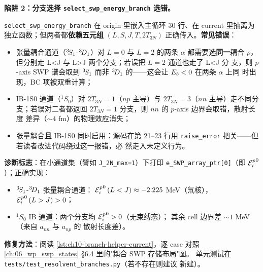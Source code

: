 \begin{pitfallbox}[label=box:ch10-pitfall-branch]
\textbf{陷阱 2：分支选择 \texttt{select\_swp\_energy\_branch} 选错。}

\texttt{select\_swp\_energy\_branch} 在 origin 里嵌入主循环 30 行、在 current
里抽离为独立函数；但两者都\textbf{依赖五元组} \((L, S, J, T, 2T_{3N})\)
正确传入。\textbf{常见错误}：

\begin{itemize}
  \item 张量耦合通道（\({}^{3}\!S_{1}\)-\({}^{3}\!D_{1}\)）对 \(L=0\)
        与 \(L=2\) 的两条 \(\alpha\) 都需要选\textbf{同一}耦合 \(\rho\)，
        但分别走 L<J 与 L>J 两个分支；若误把 \(L=2\) 通道也走了 L<J 分
        支，则 \(p\)-axis SWP 谱会取到 \({}^{3}\!S_{1}\) 而非
        \({}^{3}\!D_{1}\) 的——这会让 \(E_b < 0\) 在两条 \(\alpha\) 上同
        时出现，BC 项被双重计算；
  \item IB-1S0 通道（\({}^1S_0\)）对 \(2T_{3N}=1\)（\(np\) 主导）与
        \(2T_{3N}=3\)（\(nn\) 主导）走不同分支；若误对二者都返回
        \(2T_{3N}=1\) 分支，则 \(nn\) 的 \(p\)-axis 边界会取错，散射长度
        差异（\(\sim 4\) fm）的物理效应消失；
  \item 张量耦合\textbf{且} IB-1S0 同时启用：源码在第 21--23 行用
        \texttt{raise\_error} 把关——但若读者改进代码绕过这一报错，必
        然走入未定义行为。
\end{itemize}

\textbf{诊断标志}：在小通道集（譬如 \texttt{J\_2N\_max=1}）下打印
\texttt{e\_SWP\_array\_ptr[0]}（即 \({\mathcal{E}_{i}^{p}}^{0}\)）；正确实现：

\begin{itemize}
  \item \({}^{3}\!S_{1}\)-\({}^{3}\!D_{1}\) 张量耦合通道：
        \({\mathcal{E}_{i}^{p}}^{0}\,(L<J) \approx -2.225\) MeV（氘核），
        \({\mathcal{E}_{i}^{p}}^{0}\,(L>J) > 0\)；
  \item \({}^1S_0\) IB 通道：两个分支均 \({\mathcal{E}_{i}^{p}}^{0} > 0\)（无束缚态）；
        其余 cell 边界差 \(\sim 1\) MeV（来自 \(a_{nn}\) 与 \(a_{np}\) 的
        散射长度差）。
\end{itemize}

\textbf{修复方法}：阅读 \cref{lst:ch10-branch-helper-current}，逐 case
对照 \cref{ch:06_wp_swp_states} \S 6.4 里的"耦合 SWP 存储布局"图。
单元测试在 \texttt{tests/test\_resolvent\_branches.py}（若不存在则建议
新建）。
\end{pitfallbox}

